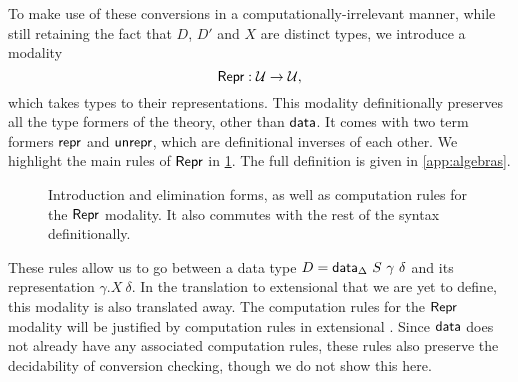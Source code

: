 To make use of these conversions in a computationally-irrelevant manner,
while still retaining the fact that $D$, $D'$ and $X$ are distinct types,
we introduce a modality
$$
\textsf{Repr} : \mathcal{U} \to \mathcal{U} ,
$$
which takes types to their representations. This modality definitionally
preserves all the type formers of the theory, other than $\textsf{data}$. It comes with
two term formers $\textsf{repr}$ and $\textsf{unrepr}$, which are definitional inverses of each other.
We highlight the main rules of $\textsf{Repr}$ in \cref{fig:repr-rules}. The full definition
is given in \cref{app:algebras}.

\begin{figure}[H]
\caption{Introduction and elimination forms, as well as computation rules
for the $\textsf{Repr}$ modality. It also commutes with the rest of the syntax
definitionally.}
\label{fig:repr-rules}
\end{figure}

These rules allow us to go between a data type $D = \textsf{data}_\Delta\ S\ \gamma\
\delta$ and its representation $\gamma.X\ \delta$. In the translation to
extensional \lambdamltt that we are yet to define, this modality is also translated
away. The computation rules for the $\textsf{Repr}$ modality will be
justified by computation rules in extensional \lambdamltt. Since $\textsf{data}$ does not
already have any associated computation rules, these rules also preserve the
decidability of conversion checking, though we do not show this here.

